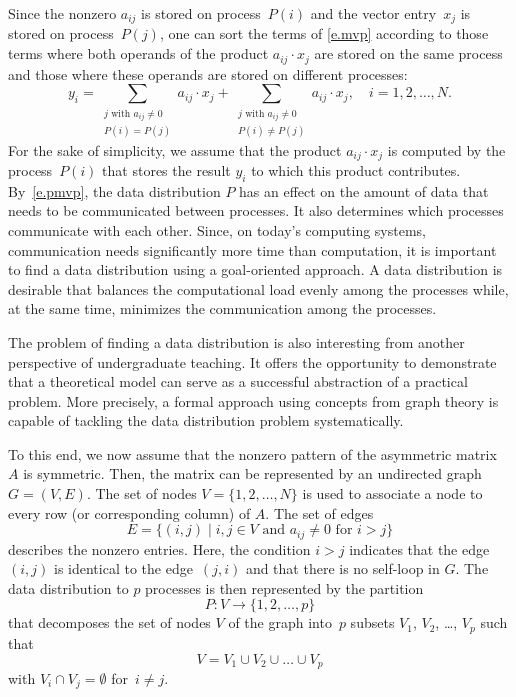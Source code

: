 \documentclass[12pt, twoside]{book}
\newcommand{\mat}[1]{\ensuremath{#1}}
\begin{document}
Since the nonzero $a_{ij}$ is stored on process~$P(i)$ and the vector entry~$x_j$ is
stored on process~$P(j)$, one can sort the terms of \eqref{e.mvp} according to
those terms where both operands of the product $a_{ij} \cdot x_j$ are stored on the same
process and those where these operands are stored on different processes:
\begin{equation}
\label{e.pmvp}
y_i =
\sum_{ \substack{j \text{ with } a_{ij} \neq 0\\ P(i)=P(j)}} a_{ij} \cdot x_j
+ \sum_{ \substack{j \text{ with } a_{ij} \neq 0\\ P(i)\neq P(j)}} a_{ij} \cdot x_j ,
\quad i = 1, 2, \dots, N.
\end{equation}
For the sake of simplicity, we assume that the product $a_{ij} \cdot x_j$ is computed by
the process~$P(i)$ that stores the result $y_i$ to which this product contributes.
By~\eqref{e.pmvp}, the data distribution $P$ has an effect on the amount of data that
needs to be communicated between processes. It also determines which processes
communicate with each other. Since, on today's computing systems, communication needs
significantly more time than computation, it is important to find a data distribution
using a goal-oriented approach. A data distribution is desirable that balances the
computational load evenly among the processes while, at the same time, minimizes the
communication among the processes.

The problem of finding a data distribution is also interesting from another perspective
of undergraduate teaching. It offers the opportunity to demonstrate that a theoretical
model can serve as a successful abstraction of a practical problem. More precisely, a
formal approach using concepts from graph theory is capable of tackling the data
distribution problem systematically.

To this end, we now assume that the nonzero pattern of the asymmetric matrix \mat{A} is
symmetric. Then, the matrix can be represented by an undirected graph $G=(V,E)$. The set
of nodes $V = \{ 1, 2, \dots, N\}$ is used to associate a node to every row (or
corresponding column) of \mat{A}. The set of edges
\begin{displaymath}
E = \{ (i,j) \mid i, j \in V \text{ and } a_{ij} \neq 0 \text{ for } i > j \}
\end{displaymath}
describes the nonzero entries. Here, the condition $i>j$ indicates that the edge~$(i,j)$
is identical to the edge~$(j,i)$ and that there is no self-loop in $G$. The data
distribution to $p$ processes is then represented by the partition
$$
P: V \rightarrow \{1, 2, \dots, p\}
$$
that decomposes the set of nodes $V$ of the graph into~$p$ subsets $V_1$, $V_2$, \dots,
$V_p$ such that
$$
V = V_1 \cup V_2 \cup \dots \cup V_p
$$
with $V_i \cap V_j = \emptyset$ for~$i \neq j$.
\end{document}
